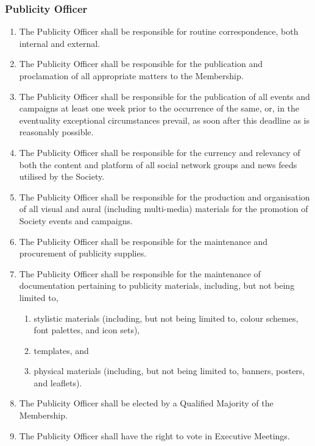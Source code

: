 \documentclass{scrartcl}
\begin{document}
            \subsubsection{Publicity Officer}
                \label{executive--positions--publicity-officer}
                \begin{enumerate}
                    \item The Publicity Officer shall be responsible for routine correspondence, both internal and external.
                    \item The Publicity Officer shall be responsible for the publication and proclamation of all appropriate matters to the Membership.
                    \item The Publicity Officer shall be responsible for the publication of all events and campaigns at least one week prior to the occurrence of the same, or, in the eventuality exceptional circumstances prevail, as soon after this deadline as is reasonably possible.
                    \item The Publicity Officer shall be responsible for the currency and relevancy of both the content and platform of all social network groups and news feeds utilised by the Society.
                    \item The Publicity Officer shall be responsible for the production and organisation of all visual and aural (including multi-media) materials for the promotion of Society events and campaigns.
                    \item The Publicity Officer shall be responsible for the maintenance and procurement of publicity supplies.
                    \item The Publicity Officer shall be responsible for the maintenance of documentation pertaining to publicity materials, including, but not being limited to,
                        \begin{enumerate}
                            \item stylistic materials (including, but not being limited to, colour schemes, font palettes, and icon sets),
                            \item templates, and
                            \item physical materials (including, but not being limited to, banners, posters, and leaflets).
                        \end{enumerate}
                    \item The Publicity Officer shall be elected by a Qualified Majority of the Membership.
                    \item The Publicity Officer shall have the right to vote in Executive Meetings.
                \end{enumerate}
\end{document}
